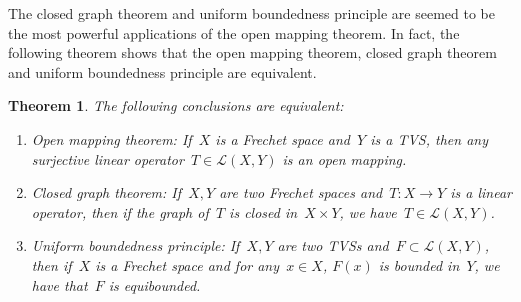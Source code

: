 \documentclass[12pt,a4paper,draft]{article}  %
\newtheorem{theorem}{Theorem}[section]
\theoremstyle{definition}
\numberwithin{equation}{section}
\begin{document}
The closed graph theorem and uniform boundedness principle are seemed to be the most powerful
applications of the open mapping theorem.
In fact, the following theorem shows that the open mapping theorem, closed graph theorem and uniform boundedness principle are equivalent.
\begin{theorem}
    The following conclusions are equivalent:
    \begin{enumerate}
        \item Open mapping theorem: If~$X$ is a Frechet space and~$Y$ is a TVS, then any surjective linear operator~$T \in \mathcal{L}(X,Y)$ is an open mapping.
        \item Closed graph theorem: If~$X,Y$ are two Frechet spaces and~$T: X \rightarrow Y$ is a linear operator, then if the graph of~$T$ is closed in~$X \times Y$, we have~$T \in \mathcal{L}(X,Y)$.
        \item Uniform boundedness principle: If~$X,Y$ are two TVSs and~$F \subset \mathcal{L}(X,Y)$, then if~$X$ is a Frechet space and for any~$x \in X$, $F(x)$ is bounded in~$Y$, we have that~$F$ is equibounded.
    \end{enumerate}
\end{theorem}
\end{document}

